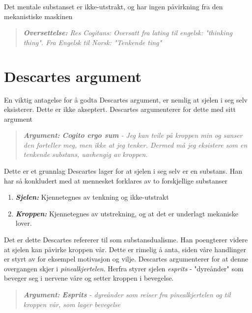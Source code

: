 \documentclass[12pt, a4paper]{article}
\newenvironment{argument}{\begin{quote}\itshape\textbf{Argument: }}{\end{quote}}
\newenvironment{oversettelse}{\begin{quote}\itshape\textbf{Oversettelse: }}{\end{quote}}
\begin{document}
Det mentale substanset er ikke-utstrakt, og har ingen påvirkning fra den mekanistiske maskinen

\begin{oversettelse}
    Res Cogitans: Oversatt fra lating til engelsk: "thinking thing". Fra Engelsk til Norsk: "Tenkende ting" 
\end{oversettelse}





\section{Descartes argument}

En viktig antagelse for å godta Descartes argument, er nemlig at sjelen i seg selv eksisterer. Dette er ikke akseptert. Descartes argumenterer for dette med sitt argument

\begin{argument}
    \textbf{\textit{Cogito ergo sum}} - Jeg kan tvile på kroppen min og sanser den forteller meg, men ikke at jeg tenker. Dermed må jeg eksistere som en tenkende substans, uavhengig av kroppen.
\end{argument}

Dette er et grunnlag Descartes lager for at sjelen i seg selv er en substans. Han har så konkludert med at mennesket forklares av to forskjellige substanser

\begin{enumerate}
    \item \textbf{\textit{Sjelen:}} Kjennetegnes av tenkning og ikke-utstrakt
    \item \textbf{\textit{Kroppen:}} Kjennetegnes av utstrekning, og at det er underlagt mekaniske lover.
\end{enumerate}

Det er dette Descartes refererer til som substansdualisme. Han poengterer videre at sjelen kan påvirke kroppen vår. Dette er rimelig å anta, siden våre handlinger er styrt av for eksempel motivasjon og vilje. Descartes argumenterer for at denne overgangen skjer i \textit{pinealkjertelen}. Herfra styrer sjelen \textit{esprits} - "dyreånder" som beveger seg i nervene våre og setter kroppen i bevegelse.

\begin{argument}
    \textbf{\textit{Esprits}} - dyreånder som reiser fra pinealkjertelen og til kroppen vår, som lager bevegelse
\end{argument}
\end{document}
